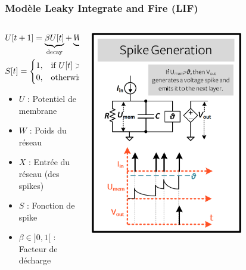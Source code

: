 \documentclass[aspectratio=169]{beamer}
\begin{document}
\begin{frame}
  \frametitle{Modèle Leaky Integrate and Fire (LIF)}
  \begin{columns}
    \begin{column}{0.5\textwidth}
      $$\begin{aligned}
           & U[t+1] = \underbrace{\beta U[t]}_\text{decay} + \underbrace{WX[t+1]}_\text{input} - \underbrace{\beta S[t]U_{\rm thr}}_\text{soft reset} \\
           & S[t] =
          \begin{cases}
            1, & \text{if } U[t] > U_{\rm thr} \\
            0, & \text{otherwise}
          \end{cases}\end{aligned}$$
      \begin{itemize}
        \item $U$ : Potentiel de membrane
        \item $W$ : Poids du réseau
        \item $X$ : Entrée du réseau (des spikes)
        \item $S$ : Fonction de spike
        \item $\beta \in ]0, 1[$ : Facteur de décharge
      \end{itemize}
    \end{column}
    \begin{column}{0.5\textwidth}
      \begin{center}
        \includegraphics[width=0.7\textwidth]{image/2_4_spiking.png}
      \end{center}

    \end{column}
  \end{columns}
\end{frame}
\end{document}
